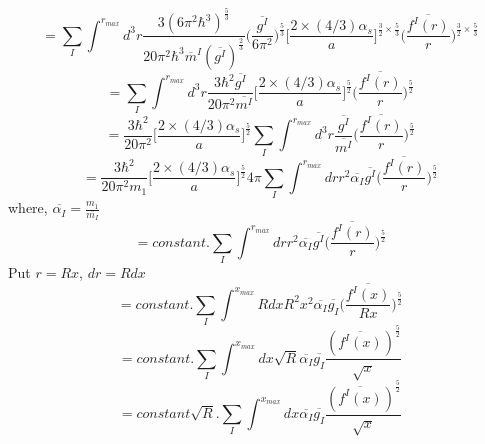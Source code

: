 \documentclass[fleqn, 10pt]{article}
\begin{document}
            \begin{equation*}
            =  \sum_I \int^{r_{max}} d^3r \frac{3(6\pi^2\hbar^3)^\frac{5}{3}}{20\pi^2\hbar^3\overline{m}^I (\overline{g^I})^\frac{2}{3}} \biggl(\frac{\overline{g^I}}{6\pi^2}\biggr)^\frac{5}{3} \biggl[\frac{2 \times (4/3)\alpha_s}{a}\biggr]^{\frac{3}{2} \times \frac{5}{3}} \biggl(\frac{\overline{f^I(r)}}{r}\biggr)^{\frac{3}{2} \times \frac{5}{3}} 
            \end{equation*}
            \begin{equation*}
             = \sum_I \int^{r_{max}} d^3r \frac{3\hbar^2 \overline{g^I}}{20 \pi^2 \overline{m^I}} \biggl[\frac{2 \times (4/3)\alpha_s}{a}\biggr]^\frac{5}{2} \biggl(\frac{\overline{f^I(r)}}{r}\biggr)^\frac{5}{2}
            \end{equation*}
            \begin{equation*}
             = \frac{3\hbar^2}{20 \pi^2} \biggl[\frac{2 \times (4/3) \alpha_s}{a} \biggr]^\frac{5}{2} \sum_I \int^{r_{max}} d^3r \frac{\overline{g^I}}{\overline{m^I}} \biggl( \frac{\overline{f^I(r)}}{r}\biggr)^\frac{5}{2}
            \end{equation*}
            \begin{equation*}
             = \frac{3\hbar^2}{20\pi^2 m_1} \biggl[\frac{2 \times (4/3) \alpha_s}{a}\biggr]^\frac{5}{2} 4 \pi \sum_I \int^{r_{max}} dr r^2 \overline{\alpha_I} \overline{g^I} \biggl(\frac{\overline{f^I(r)}}{r}\biggr)^\frac{5}{2} 
            \end{equation*}
            where, 
            $\overline{\alpha_I} = \frac{m_1}{\overline{m_I}}$
            \begin{equation*}
            = constant. \sum_I \int^{r_{max}} dr r^2 \overline{\alpha_I} \overline{g^I} \biggl(\frac{\overline{f^I(r)}}{r}\biggr)^\frac{5}{2}
            \end{equation*}
            Put $r=Rx$, $dr= Rdx$ 
            \begin{equation*}
            = constant. \sum_I \int^{x_{max}} Rdx R^2 x^2 \overline{\alpha_I} \overline{g_I} \biggl(\frac{\overline{f^I(x)}}{Rx}\biggr)^\frac{5}{2}
            \end{equation*}
            \begin{equation*}
            = constant. \sum_I \int^{x_{max}} dx \sqrt{R} \overline{\alpha_I} \overline{g_I}\frac{(\overline{f^I(x)})^\frac{5}{2}}{\sqrt{x}}
            \end{equation*}
            \begin{equation*}
            = constant \sqrt{R}. \sum_I \int^{x_{max}} dx \overline{\alpha_I} \overline{g_I} \frac{(\overline{f^I(x)})^\frac{5}{2}}{\sqrt{x}}
            \end{equation*}
\end{document}
